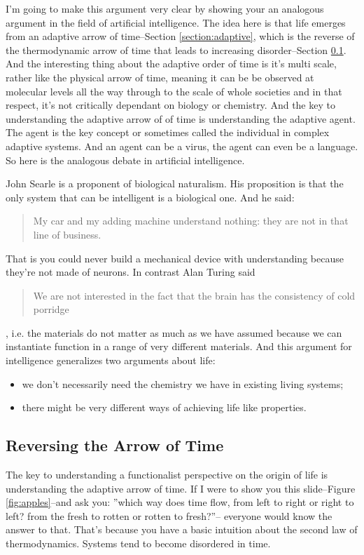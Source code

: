 \documentclass[]{article}
\begin{document}
I'm going to make this argument very clear by showing your an analogous argument in the field of artificial intelligence. The idea here is that life emerges from an adaptive arrow of time--Section \ref{section:adaptive}, which is the reverse of the thermodynamic arrow of time that leads to increasing disorder--Section \ref{section:reversing}. And the interesting thing about the adaptive order of time is it's multi scale, rather like the physical arrow of time, meaning it can be be observed at molecular levels all the way through to the scale of whole societies and in that respect, it's not critically dependant on biology or chemistry. And the key to understanding the adaptive arrow of of time is understanding the adaptive agent. The agent is the key concept or sometimes called the individual in complex adaptive systems. And an agent can be a virus, the agent can even be a language. So here is the analogous debate in artificial intelligence.

John Searle is a proponent of biological naturalism. His proposition is that the only system that can be intelligent is a biological one. And he said: \begin{quotation}
	My car and my adding machine 	understand nothing: they are not in that line of business.
\end{quotation} That is you could never build a mechanical device with understanding because they're not made of neurons. In contrast Alan Turing said 	\begin{quotation}
We are not interested in the fact that the brain has the consistency of cold porridge
\end{quotation}, i.e. the materials do not matter as much as we have assumed because we can instantiate function in a range of very different materials. And this argument for intelligence generalizes two arguments about life:
\begin{itemize}
	\item we don't necessarily need the chemistry we have in existing living systems;
	\item there might be very different ways of achieving life like properties.
\end{itemize}



\subsection{Reversing the Arrow of Time}\label{section:reversing}

The key to understanding a functionalist perspective on the origin of life
is understanding the adaptive arrow of time.
If I were to show you this slide--Figure \ref{fig:apples}--and ask you: ''which
way does time flow, from left to right
or right to left? from the fresh to rotten or
rotten to fresh?''-- everyone would know the
answer to that. That's because you have
a basic intuition about the second law of thermodynamics.
Systems tend to become disordered in time.
\end{document}
